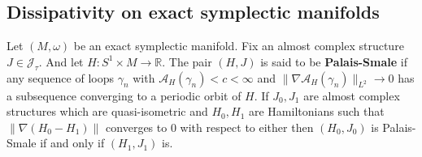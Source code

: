\documentclass[11pt]{amsart}
\newcommand{\R}{\mathbb{R}}
\theoremstyle{definition}
\theoremstyle{remark}
\begin{document}
\subsection{Dissipativity on exact symplectic manifolds}\label{SubSec52}
Let $(M,\omega)$ be an exact symplectic manifold. Fix an almost complex structure $J\in\mathcal{J}_\tau$. And let $H:S^1\times M\to\R$. The pair $(H,J)$ is said to be \textbf{Palais-Smale} if any sequence of loops $\gamma_n$ with $\mathcal{A}_H(\gamma_n)<c<\infty$ and $\|\nabla\mathcal{A}_H(\gamma_n)\|_{L^2}\to 0$ has a subsequence converging to a periodic orbit of $H$. If $J_0,J_1$ are almost complex structures which are quasi-isometric and $H_0,H_1$ are Hamiltonians such that $\|\nabla (H_0-H_1)\|$ converges to $0$ with respect to either then $(H_0,J_0)$ is Palais-Smale if and only if $(H_1,J_1)$ is.
\end{document}
